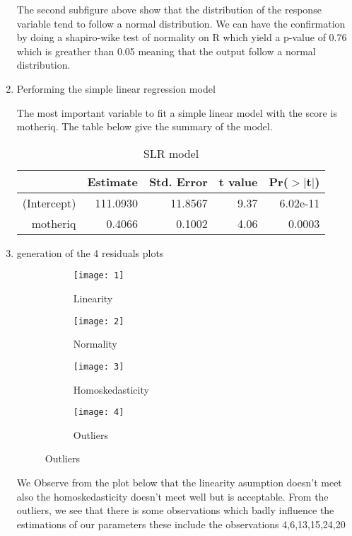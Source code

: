 \documentclass[12pt,a4paper]{article}
\begin{document}
\begin{enumerate}
The second subfigure above show that the distribution of the response variable tend to follow a normal distribution. We can have the confirmation by doing a shapiro-wike test of normality on R which yield a p-value of 0.76 which is greather than 0.05 meaning that the output follow a normal distribution.
	
\item Performing the simple linear regression model

The most important variable to fit a simple linear model with the score is motheriq. The table below give the summary of the model.
\begin{table}[ht]
	\centering
	\begin{tabular}{rrrrr}
		\hline
		& Estimate & Std. Error & t value & Pr($>$$|$t$|$) \\ 
		\hline
		(Intercept) & 111.0930 & 11.8567 & 9.37 & 6.02e-11 \\ 
		motheriq & 0.4066 & 0.1002 & 4.06 & 0.0003 \\ 
		\hline
	\end{tabular}
\caption{SLR model}
\end{table}

\item generation of the 4 residuals plots

\begin{figure}[H]

	\centering
	\begin{subfigure}[b]{0.4\textwidth}
		\caption{Linearity}
		\centering
		\texttt{[image: 1]}
	\end{subfigure}
	\begin{subfigure}[b]{0.4\textwidth}
		\caption{Normality}
		\centering
		\texttt{[image: 2]}
	\end{subfigure}

	\centering
	\begin{subfigure}[b]{0.4\textwidth}
		\caption{Homoskedasticity}
		\centering
		\texttt{[image: 3]}
	\end{subfigure}
	\begin{subfigure}[b]{0.4\textwidth}
		\caption{Outliers}
		\centering
		\texttt{[image: 4]}
	\end{subfigure}
	
\end{figure}

We Observe from the plot below that the linearity asumption doesn't meet also the homoskedasticity doesn't meet well but is acceptable. From the outliers, we see  that there is some observations which badly influence the estimations of our parameters these include the observations 4,6,13,15,24,20



\end{enumerate}
\end{document}
